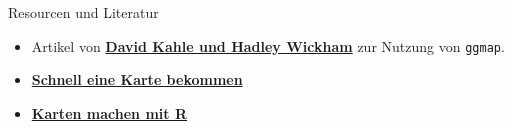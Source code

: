 \documentclass[ignorenonframetext,]{beamer}
\begin{document}
\begin{frame}[fragile]{Resourcen und Literatur}

\begin{itemize}
\item
  Artikel von
  \href{http://journal.r-project.org/archive/2013-1/kahle-wickham.pdf}{\textbf{David
  Kahle und Hadley Wickham}} zur Nutzung von \texttt{ggmap}.
\item
  \href{http://rpackages.ianhowson.com/cran/ggmap/man/get_map.html}{\textbf{Schnell
  eine Karte bekommen}}
\item
  \href{http://www.kevjohnson.org/making-maps-in-r-part-2/}{\textbf{Karten
  machen mit R}}
\end{itemize}

\end{frame}
\end{document}
